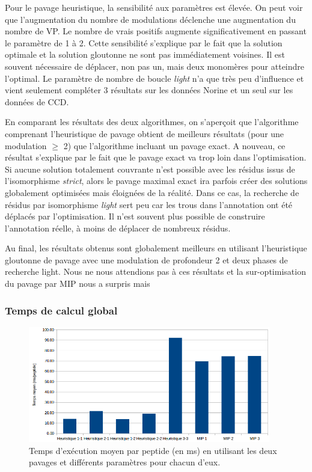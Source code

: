 Pour le pavage heuristique, la sensibilité aux paramètres est élevée.
On peut voir que l'augmentation du nombre de modulations déclenche une augmentation du nombre de VP.
Le nombre de vrais positifs augmente significativement en passant le paramètre de 1 à 2.
Cette sensibilité s'explique par le fait que la solution optimale et la solution gloutonne ne sont pas immédiatement voisines.
Il est souvent nécessaire de déplacer, non pas un, mais deux monomères pour atteindre l'optimal.
Le paramètre de nombre de boucle \textit{light} n'a que très peu d'influence et vient seulement compléter 3 résultats sur les données Norine et un seul sur les données de CCD.

En comparant les résultats des deux algorithmes, on s'aperçoit que l'algorithme comprenant l'heuristique de pavage obtient de meilleurs résultats (pour une modulation $\ge$ 2) que l'algorithme incluant un pavage exact.
A nouveau, ce résultat s'explique par le fait que le pavage exact va trop loin dans l'optimisation.
Si aucune solution totalement couvrante n'est possible avec les résidus issus de l'isomorphisme \textit{strict}, alors le pavage maximal exact ira parfois créer des solutions globalement optimisées mais éloignées de la réalité.
Dans ce cas, la recherche de résidus par isomorphisme \textit{light} sert peu car les trous dans l'annotation ont été déplacés par l'optimisation.
Il n'est souvent plus possible de construire l'annotation réelle, à moins de déplacer de nombreux résidus.

Au final, les résultats obtenus sont globalement meilleurs en utilisant l'heuristique gloutonne de pavage avec une modulation de profondeur 2 et deux phases de recherche light.
Nous ne nous attendions pas à ces résultats et la sur-optimisation du pavage par MIP nous a surpris mais 


\subsubsection{Temps de calcul global}

\begin{figure}[!ht]
  \begin{center}
    \includegraphics[width=400px]{Figures/s2m/results/temps.png}
    \caption{\label{temps_general}Temps d'exécution moyen par peptide (en ms) en utilisant les deux pavages et différents paramètres pour chacun d'eux.}
  \end{center}
\end{figure}

